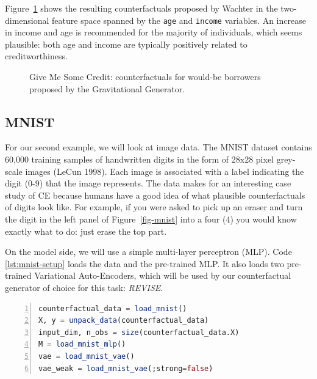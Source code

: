 \documentclass{juliacon}
\begin{document}
Figure~\ref{fig-credit} shows the resulting counterfactuals proposed by
Wachter in the two-dimensional feature space spanned by the \texttt{age}
and \texttt{income} variables. An increase in income and age is
recommended for the majority of individuals, which seems plausible: both
age and income are typically positively related to creditworthiness.

\begin{figure}


\caption{\label{fig-credit}Give Me Some Credit: counterfactuals for
would-be borrowers proposed by the Gravitational Generator.}

\end{figure}%

\subsection{MNIST}\label{mnist}

For our second example, we will look at image data. The MNIST dataset
contains 60,000 training samples of handwritten digits in the form of
28x28 pixel grey-scale images (LeCun 1998). Each image is associated
with a label indicating the digit (0-9) that the image represents. The
data makes for an interesting case study of CE because humans have a
good idea of what plausible counterfactuals of digits look like. For
example, if you were asked to pick up an eraser and turn the digit in
the left panel of Figure~\ref{fig-mnist} into a four (4) you would know
exactly what to do: just erase the top part.

On the model side, we will use a simple multi-layer perceptron (MLP).
Code \ref{lst:mnist-setup} loads the data and the pre-trained MLP. It
also loads two pre-trained Variational Auto-Encoders, which will be used
by our counterfactual generator of choice for this task: \emph{REVISE}.

\begin{lstlisting}[language=Julia, escapechar=@, numbers=left, label={lst:mnist-setup}, caption={Loading pre-trained models and data for MNIST.}]
counterfactual_data = load_mnist()
X, y = unpack_data(counterfactual_data)
input_dim, n_obs = size(counterfactual_data.X)
M = load_mnist_mlp()
vae = load_mnist_vae()
vae_weak = load_mnist_vae(;strong=false)
\end{lstlisting}
\end{document}
